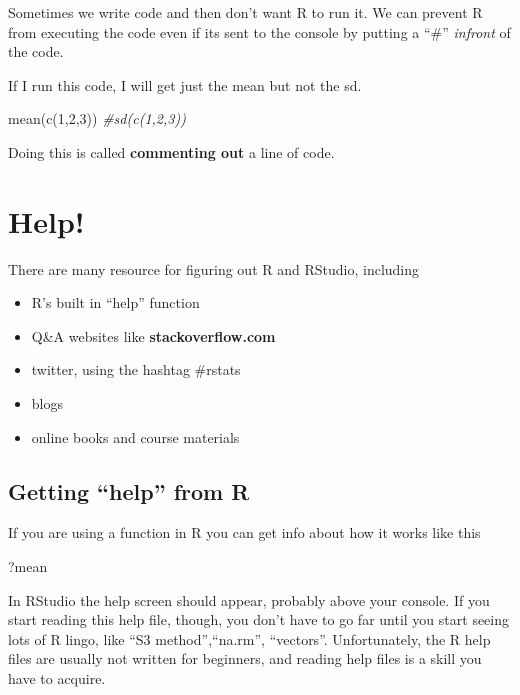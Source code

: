 \documentclass[
]{book}
\newenvironment{Shaded}{\begin{snugshade}}{\end{snugshade}}
\newcommand{\CommentTok}[1]{\textcolor[rgb]{0.56,0.35,0.01}{\textit{#1}}}
\newcommand{\DecValTok}[1]{\textcolor[rgb]{0.00,0.00,0.81}{#1}}
\newcommand{\FunctionTok}[1]{\textcolor[rgb]{0.00,0.00,0.00}{#1}}
\newcommand{\NormalTok}[1]{#1}
\providecommand{\tightlist}{%
  \setlength{\itemsep}{0pt}\setlength{\parskip}{0pt}}
\begin{document}
Sometimes we write code and then don't want R to run it. We can prevent R from executing the code even if its sent to the console by putting a ``\#'' \emph{infront} of the code.

If I run this code, I will get just the mean but not the sd.

\begin{Shaded}
\begin{Highlighting}[]
\FunctionTok{mean}\NormalTok{(}\FunctionTok{c}\NormalTok{(}\DecValTok{1}\NormalTok{,}\DecValTok{2}\NormalTok{,}\DecValTok{3}\NormalTok{))}
\CommentTok{\#sd(c(1,2,3))}
\end{Highlighting}
\end{Shaded}

Doing this is called \textbf{commenting out} a line of code.

\hypertarget{help}{%
\section{Help!}\label{help}}

There are many resource for figuring out R and RStudio, including

\begin{itemize}
\tightlist
\item
  R's built in ``help'' function
\item
  Q\&A websites like \textbf{stackoverflow.com}
\item
  twitter, using the hashtag \#rstats
\item
  blogs
\item
  online books and course materials
\end{itemize}

\hypertarget{getting-help-from-r}{%
\subsection{Getting ``help'' from R}\label{getting-help-from-r}}

If you are using a function in R you can get info about how it works like this

\begin{Shaded}
\begin{Highlighting}[]
\NormalTok{?mean}
\end{Highlighting}
\end{Shaded}

In RStudio the help screen should appear, probably above your console. If you start reading this help file, though, you don't have to go far until you start seeing lots of R lingo, like ``S3 method'',``na.rm'', ``vectors''. Unfortunately, the R help files are usually not written for beginners, and reading help files is a skill you have to acquire.
\end{document}

